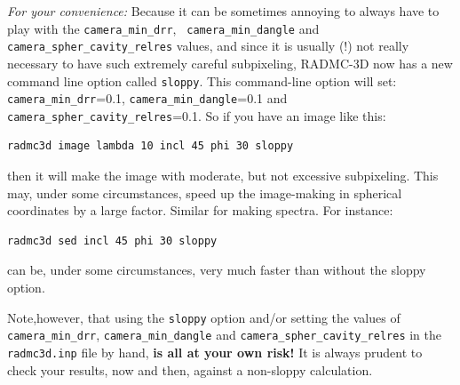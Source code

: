 \documentclass{report}
\newenvironment{asciibox}%
  {\begin{list}{}{%
    \setlength{\topsep}{0.5em}%
    \setlength{\parskip}{0em}%
    \setlength{\parsep}{0em}%
    \setlength{\itemsep}{0em}%
    \setlength{\rightmargin}{0em}%
    \setlength{\leftmargin}{3.0em}%
    \setlength{\labelsep}{1em}%
    \setlength{\labelwidth}{2em}%
  }\normalfont\footnotesize\item}
  {\end{list}}
\begin{document}
{\em For your convenience:} Because it can be sometimes annoying to always
have to play with the {\small\tt camera\_min\_drr}, {\small\tt
  camera\_min\_dangle} and {\small\tt camera\_spher\_cavity\_relres} values,
and since it is usually (!) not really necessary to have such extremely
careful subpixeling, RADMC-3D now has a new command line option called
{\small\tt sloppy}. This command-line option will set: {\small\tt
  camera\_min\_drr}=0.1, {\small\tt camera\_min\_dangle}=0.1 and {\small\tt
  camera\_spher\_cavity\_relres}=0.1. So if you have an image like this:
\begin{asciibox}\begin{verbatim}
radmc3d image lambda 10 incl 45 phi 30 sloppy
\end{verbatim}\end{asciibox}
then it will make the image with moderate, but not excessive subpixeling.
This may, under some circumstances, speed up the image-making in spherical
coordinates by a large factor. Similar for making spectra. For instance:
\begin{asciibox}\begin{verbatim}
radmc3d sed incl 45 phi 30 sloppy
\end{verbatim}\end{asciibox}
can be, under some circumstances, very much faster than without the sloppy
option.

Note,however, that using the {\small\tt sloppy} option and/or setting the
values of {\small\tt camera\_min\_drr}, {\small\tt camera\_min\_dangle} and
{\small\tt camera\_spher\_cavity\_relres} in the {\small\tt radmc3d.inp}
file by hand, {\bf is all at your own risk!} It is always prudent to check
your results, now and then, against a non-sloppy calculation.
\end{document}
